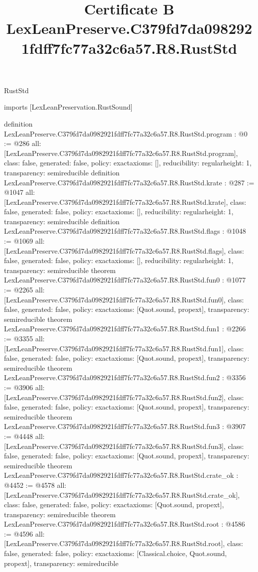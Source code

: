 \begin{lexlean}{RustStd}
\title{Certificate B LexLeanPreserve.C379fd7da0982921fdff7fc77a32c6a57.R8.RustStd}
\begin{coremodule}
imports [LexLeanPreservation.RustSound]

definition LexLeanPreserve.C379fd7da0982921fdff7fc77a32c6a57.R8.RustStd.program : @0 := @286 {
  all: [LexLeanPreserve.C379fd7da0982921fdff7fc77a32c6a57.R8.RustStd.program],
  class: false,
  generated: false,
  policy: exact{axioms: []},
  reducibility: regular{height: 1},
  transparency: semireducible
}
definition LexLeanPreserve.C379fd7da0982921fdff7fc77a32c6a57.R8.RustStd.krate : @287 := @1047 {
  all: [LexLeanPreserve.C379fd7da0982921fdff7fc77a32c6a57.R8.RustStd.krate],
  class: false,
  generated: false,
  policy: exact{axioms: []},
  reducibility: regular{height: 1},
  transparency: semireducible
}
definition LexLeanPreserve.C379fd7da0982921fdff7fc77a32c6a57.R8.RustStd.flags : @1048 := @1069 {
  all: [LexLeanPreserve.C379fd7da0982921fdff7fc77a32c6a57.R8.RustStd.flags],
  class: false,
  generated: false,
  policy: exact{axioms: []},
  reducibility: regular{height: 1},
  transparency: semireducible
}
theorem LexLeanPreserve.C379fd7da0982921fdff7fc77a32c6a57.R8.RustStd.fun0 : @1077 := @2265 {
  all: [LexLeanPreserve.C379fd7da0982921fdff7fc77a32c6a57.R8.RustStd.fun0],
  class: false,
  generated: false,
  policy: exact{axioms: [Quot.sound, propext]},
  transparency: semireducible
}
theorem LexLeanPreserve.C379fd7da0982921fdff7fc77a32c6a57.R8.RustStd.fun1 : @2266 := @3355 {
  all: [LexLeanPreserve.C379fd7da0982921fdff7fc77a32c6a57.R8.RustStd.fun1],
  class: false,
  generated: false,
  policy: exact{axioms: [Quot.sound, propext]},
  transparency: semireducible
}
theorem LexLeanPreserve.C379fd7da0982921fdff7fc77a32c6a57.R8.RustStd.fun2 : @3356 := @3906 {
  all: [LexLeanPreserve.C379fd7da0982921fdff7fc77a32c6a57.R8.RustStd.fun2],
  class: false,
  generated: false,
  policy: exact{axioms: [Quot.sound, propext]},
  transparency: semireducible
}
theorem LexLeanPreserve.C379fd7da0982921fdff7fc77a32c6a57.R8.RustStd.fun3 : @3907 := @4448 {
  all: [LexLeanPreserve.C379fd7da0982921fdff7fc77a32c6a57.R8.RustStd.fun3],
  class: false,
  generated: false,
  policy: exact{axioms: [Quot.sound, propext]},
  transparency: semireducible
}
theorem LexLeanPreserve.C379fd7da0982921fdff7fc77a32c6a57.R8.RustStd.crate_ok : @4452 := @4578 {
  all: [LexLeanPreserve.C379fd7da0982921fdff7fc77a32c6a57.R8.RustStd.crate_ok],
  class: false,
  generated: false,
  policy: exact{axioms: [Quot.sound, propext]},
  transparency: semireducible
}
theorem LexLeanPreserve.C379fd7da0982921fdff7fc77a32c6a57.R8.RustStd.root : @4586 := @4596 {
  all: [LexLeanPreserve.C379fd7da0982921fdff7fc77a32c6a57.R8.RustStd.root],
  class: false,
  generated: false,
  policy: exact{axioms: [Classical.choice, Quot.sound, propext]},
  transparency: semireducible
}


\end{coremodule}
\end{lexlean}
